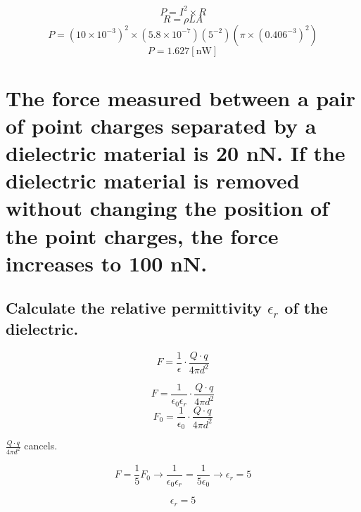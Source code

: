 \documentclass[14pt]{extarticle}
\begin{document}
$$P=I^2\times R$$
$$R=\rho L A$$
$$P=(10\times10^{-3})^2\times\left(5.8 \times 10^{-7}\right)(5^{-2})(\pi \times (0.406^{-3})^2)$$
$$P=1.627[\mathrm{nW}]$$

\clearpage

\boldmath
\section{The force measured between a pair of point charges
  separated by a dielectric material is 20 nN. If the
  dielectric material is removed without changing
  the position of the point charges, the force increases
  to 100 nN.}
\unboldmath

\boldmath
\subsection{Calculate the relative permittivity $\epsilon_r$ of the dielectric.}
\unboldmath

$$F=\frac{1}{\epsilon}\cdot\frac{Q\cdot q}{4\pi d^2}$$

$$F=\frac{1}{\epsilon_0\epsilon_r}\cdot\frac{Q\cdot q}{4\pi d^2}$$
$$F_0=\frac{1}{\epsilon_0}\cdot\frac{Q\cdot q}{4\pi d^2}$$

\begin{center}
	$\frac{Q\cdot q}{4\pi d^2}$ cancels.
\end{center}

$$F=\frac15 F_0\rightarrow\frac{1}{\epsilon_0\epsilon_r}=\frac{1}{5\epsilon_0}\rightarrow\epsilon_r = 5$$

$$\epsilon_r=5$$
\end{document}
